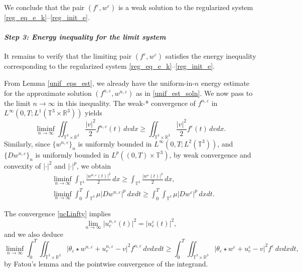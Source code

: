 \documentclass[10pt,reqno]{amsart}
\numberwithin{equation}{section}
\newcommand{\R}{\mathbb R}
\newcommand{\T}{\mathbb T}
\newcommand{\e}{\varepsilon}
\begin{document}
We conclude that the pair $(f^\e, w^\e)$ is a weak solution to the regularized system \eqref{reg_eq_e_k}--\eqref{reg_init_e}.

\medskip

\paragraph{\it Step 3: Energy inequality for the limit system}

It remains to verify that the limiting pair $(f^\e, w^\e)$ satisfies the energy inequality corresponding to the regularized system \eqref{reg_eq_e_k}--\eqref{reg_init_e}.

From Lemma \ref{unif_eps_est}, we already have the uniform-in-$n$ energy estimate for the approximate solution $(f^{n,\e}, w^{n,\e})$ as in \eqref{unif_est_soln}. We now pass to the limit $n \to \infty$ in this inequality. The weak-* convergence of $f^{n,\e}$ in $L^\infty(0,T;L^1(\T^3 \times \R^3))$ yields
\[
\liminf_{n \to \infty} \iint_{\T^3 \times \R^3} \frac{|v|^2}{2} f^{n,\e}(t)\,dvdx \ge \iint_{\T^3 \times \R^3} \frac{|v|^2}{2} f^\e(t)\,dvdx.
\]
 Similarly, since $\{ w^{n,\e} \}_n$ is uniformly bounded in $L^\infty(0,T;L^2(\T^3))$, and  $\{ D w^{n,\e} \}_n$ is uniformly bounded in $L^p((0,T)\times \T^3)$,
by weak convergence and convexity of $|\cdot|^2$ and $|\cdot|^p$, we obtain
\[
\begin{aligned}
&\liminf_{n \to \infty} \int_{\T^3} \frac{|w^{n,\e}(t)|^2}{2}\,dx \ge \int_{\T^3} \frac{|w^\e(t)|^2}{2}\,dx, \\
&\liminf_{n \to \infty} \int_0^T \int_{\T^3} \mu |D w^{n,\e}|^p\,dxdt \ge \int_0^T \int_{\T^3} \mu |D w^\e|^p\,dxdt.
\end{aligned}
\]

The convergence \eqref{ucLinfty} implies
\[
\lim_{n \to \infty} |u_c^{n,\e}(t)|^2 = |u_c^\e(t)|^2,
\]
and we also deduce
\[
\liminf_{n \to \infty} \int_0^T \iint_{\T^3 \times \R^3} |\theta_\e \star w^{n,\e} + u_c^{n,\e} - v|^2 f^{n,\e}\,dvdxdt \ge \int_0^T \iint_{\T^3 \times \R^3} |\theta_\e \star w^\e + u_c^\e - v|^2 f^\e\,dvdxdt,
\]
by Fatou's lemma and the pointwise convergence of the integrand.
\end{document}
